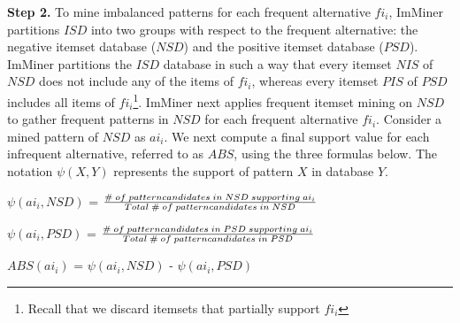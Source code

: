 \textbf{Step 2.} To mine imbalanced patterns for each frequent alternative $fi_i$, ImMiner partitions $ISD$ into two 
groups with respect to the frequent alternative: the negative itemset database ($NSD$) and the positive itemset database ($PSD$). ImMiner partitions the $ISD$ database in such a way that every itemset $NIS$ of $NSD$ does not include any of the items of $fi_i$, whereas every itemset $PIS$ of $PSD$ includes all items of $fi_i$\footnote{Recall that we discard itemsets that partially support $fi_i$}. ImMiner next applies frequent itemset mining on $NSD$ to gather frequent patterns in $NSD$ for each frequent alternative $fi_i$. Consider a mined pattern of $NSD$ as $ai_i$. We next compute a final support value for each infrequent alternative, referred to as $ABS$, using the three formulas below. The notation $\psi(X, Y)$ represents the support of pattern $X$ in database $Y$.

\begin{CodeOut}
\begin{Itemize}
\item $\psi(ai_i, NSD)$ = $\frac{\#\hspace{0.03in}of\hspace{0.03in}pattern candidates\hspace{0.03in}in\hspace{0.03in}NSD\hspace{0.03in}supporting\hspace{0.03in}ai_i}{Total\hspace{0.03in}\#\hspace{0.03in}of\hspace{0.03in}pattern candidates\hspace{0.03in}in\hspace{0.03in}NSD}$\\
\item $\psi(ai_i, PSD)$ = $\frac{\#\hspace{0.03in}of\hspace{0.03in}pattern candidates\hspace{0.03in}in\hspace{0.03in}PSD \hspace{0.03in}supporting\hspace{0.03in}ai_i}{Total\hspace{0.03in}\#\hspace{0.03in}of\hspace{0.03in}pattern candidates\hspace{0.03in}in\hspace{0.03in}PSD}$\\
\item $ABS(ai_i)$ = $\psi(ai_i, NSD)$ - $\psi(ai_i, PSD)$\\
\end{Itemize}
\end{CodeOut}
 
